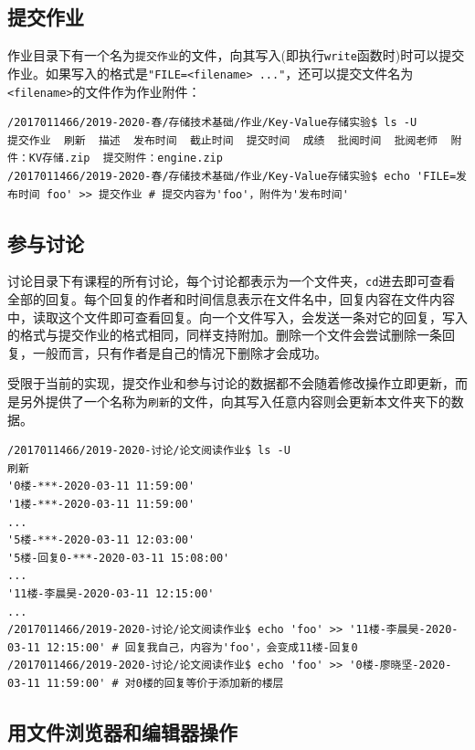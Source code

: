 \documentclass[12pt, UTF8]{article}
\begin{document}
\subsection{提交作业}

作业目录下有一个名为\lstinline|提交作业|的文件，向其写入(即执行\lstinline|write|函数时)时可以提交作业。如果写入的格式是\lstinline|"FILE=<filename> ..."|，还可以提交文件名为\lstinline|<filename>|的文件作为作业附件：

\begin{lstlisting}[language = {}]
/2017011466/2019-2020-春/存储技术基础/作业/Key-Value存储实验$ ls -U
提交作业  刷新  描述  发布时间  截止时间  提交时间  成绩  批阅时间  批阅老师  附件：KV存储.zip  提交附件：engine.zip
/2017011466/2019-2020-春/存储技术基础/作业/Key-Value存储实验$ echo 'FILE=发布时间 foo' >> 提交作业 # 提交内容为'foo'，附件为'发布时间'
\end{lstlisting}

\subsection{参与讨论}

讨论目录下有课程的所有讨论，每个讨论都表示为一个文件夹，\lstinline|cd|进去即可查看全部的回复。每个回复的作者和时间信息表示在文件名中，回复内容在文件内容中，读取这个文件即可查看回复。向一个文件写入，会发送一条对它的回复，写入的格式与提交作业的格式相同，同样支持附加。删除一个文件会尝试删除一条回复，一般而言，只有作者是自己的情况下删除才会成功。

受限于当前的实现，提交作业和参与讨论的数据都不会随着修改操作立即更新，而是另外提供了一个名称为\lstinline|刷新|的文件，向其写入任意内容则会更新本文件夹下的数据。

\begin{lstlisting}[language = {}]
/2017011466/2019-2020-讨论/论文阅读作业$ ls -U
刷新
'0楼-***-2020-03-11 11:59:00'
'1楼-***-2020-03-11 11:59:00'
...
'5楼-***-2020-03-11 12:03:00'
'5楼-回复0-***-2020-03-11 15:08:00'
...
'11楼-李晨昊-2020-03-11 12:15:00'
...
/2017011466/2019-2020-讨论/论文阅读作业$ echo 'foo' >> '11楼-李晨昊-2020-03-11 12:15:00' # 回复我自己，内容为'foo'，会变成11楼-回复0
/2017011466/2019-2020-讨论/论文阅读作业$ echo 'foo' >> '0楼-廖晓坚-2020-03-11 11:59:00' # 对0楼的回复等价于添加新的楼层
\end{lstlisting}

\subsection{用文件浏览器和编辑器操作}
\end{document}

